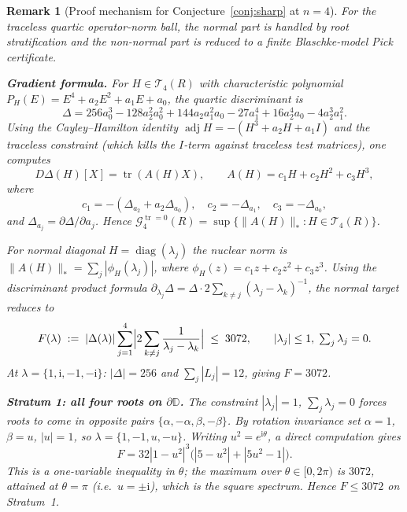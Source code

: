 \documentclass[11pt]{article}
\newtheorem{remark}[theorem]{Remark}
\numberwithin{equation}{section}
\DeclareMathOperator{\tr}{tr}
\DeclareMathOperator{\diag}{diag}
\newcommand{\bbD}{\mathbb D}
\newcommand{\cG}{\mathcal G}
\newcommand{\cT}{\mathcal T}
\newcommand{\ii}{\mathrm i}
\begin{document}
\begin{remark}[Proof mechanism for Conjecture~\ref{conj:sharp} at $n=4$]
\label{rem:n4-progress}
For the traceless quartic operator-norm ball, the normal part is handled by
root stratification and the non-normal part is reduced to a finite
Blaschke-model Pick certificate.

\smallskip
\noindent\textbf{Gradient formula.}
For $H\in\cT_4(R)$ with characteristic polynomial
$P_H(E)=E^4+a_2E^2+a_1E+a_0$, the quartic discriminant is
\[
  \Delta=256a_0^3-128a_2^2a_0^2+144a_2a_1^2a_0-27a_1^4+16a_2^4a_0-4a_2^3a_1^2.
\]
Using the Cayley--Hamilton identity $\operatorname{adj}H=-(H^3+a_2H+a_1I)$ and
the traceless constraint (which kills the $I$-term against traceless test
matrices), one computes
\[
  D\Delta(H)[X]=\operatorname{tr}(A(H)X),\qquad
  A(H)=c_1H+c_2H^2+c_3H^3,
\]
where
\[
  c_1=-(\Delta_{a_2}+a_2\Delta_{a_0}),\quad
  c_2=-\Delta_{a_1},\quad
  c_3=-\Delta_{a_0},
\]
and $\Delta_{a_j}=\partial\Delta/\partial a_j$.  Hence
$\cG_4^{\tr=0}(R)=\sup\{\|A(H)\|_*: H\in\cT_4(R)\}$.

For normal diagonal $H=\diag(\lambda_j)$ the nuclear norm is
$\|A(H)\|_*=\sum_j|\phi_H(\lambda_j)|$, where
$\phi_H(z)=c_1z+c_2z^2+c_3z^3$.
Using the discriminant product formula
$\partial_{\lambda_j}\Delta=\Delta\cdot2\sum_{k\ne j}(\lambda_j-\lambda_k)^{-1}$,
the normal target reduces to
\begin{equation}\label{eq:F4-target}
  F(\lambda)\;:=\;|\Delta(\lambda)|\sum_{j=1}^{4}
  \Bigl|2\sum_{k\ne j}\frac{1}{\lambda_j-\lambda_k}\Bigr|
  \;\le\;3072,
  \qquad |\lambda_j|\le1,\;\textstyle\sum_j\lambda_j=0.
\end{equation}
At $\lambda=\{1,\ii,-1,-\ii\}$: $|\Delta|=256$ and $\sum_j|L_j|=12$, giving
$F=3072$.

\smallskip
\noindent\textbf{Stratum 1: all four roots on $\partial\bbD$.}
The constraint $|\lambda_j|=1$, $\sum_j\lambda_j=0$ forces roots to come in
opposite pairs $\{\alpha,-\alpha,\beta,-\beta\}$.  By rotation invariance set
$\alpha=1$, $\beta=u$, $|u|=1$, so $\lambda=\{1,-1,u,-u\}$.
Writing $u^2=e^{\ii\theta}$, a direct computation gives
\[
  F=32|1-u^2|^3\bigl(|5-u^2|+|5u^2-1|\bigr).
\]
This is a one-variable inequality in $\theta$; the maximum over $\theta\in[0,2\pi)$
is $3072$, attained at $\theta=\pi$ (i.e.\ $u=\pm\ii$), which is the square
spectrum.  Hence $F\le3072$ on Stratum~1.


\end{remark}
\end{document}
